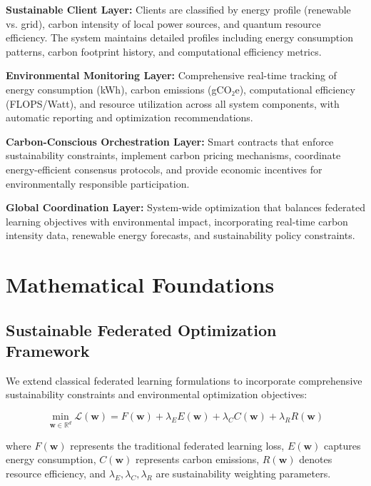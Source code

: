 \documentclass[10pt,journal,compsoc]{IEEEtran}
\newcommand{\vect}[1]{\mathbf{#1}}
\newcommand{\field}[1]{\mathbb{#1}}
\begin{document}
\textbf{Sustainable Client Layer:} Clients are classified by energy profile (renewable vs. grid), carbon intensity of local power sources, and quantum resource efficiency. The system maintains detailed profiles including energy consumption patterns, carbon footprint history, and computational efficiency metrics.

\textbf{Environmental Monitoring Layer:} Comprehensive real-time tracking of energy consumption (kWh), carbon emissions (gCO₂e), computational efficiency (FLOPS/Watt), and resource utilization across all system components, with automatic reporting and optimization recommendations.

\textbf{Carbon-Conscious Orchestration Layer:} Smart contracts that enforce sustainability constraints, implement carbon pricing mechanisms, coordinate energy-efficient consensus protocols, and provide economic incentives for environmentally responsible participation.

\textbf{Global Coordination Layer:} System-wide optimization that balances federated learning objectives with environmental impact, incorporating real-time carbon intensity data, renewable energy forecasts, and sustainability policy constraints.

\section{Mathematical Foundations}

\subsection{Sustainable Federated Optimization Framework}

We extend classical federated learning formulations to incorporate comprehensive sustainability constraints and environmental optimization objectives:

\begin{equation}
\min_{\vect{w} \in \field{R}^d} \mathcal{L}(\vect{w}) = F(\vect{w}) + \lambda_E E(\vect{w}) + \lambda_C C(\vect{w}) + \lambda_R R(\vect{w})
\label{eq:sustainable_objective}
\end{equation}

where $F(\vect{w})$ represents the traditional federated learning loss, $E(\vect{w})$ captures energy consumption, $C(\vect{w})$ represents carbon emissions, $R(\vect{w})$ denotes resource efficiency, and $\lambda_E, \lambda_C, \lambda_R$ are sustainability weighting parameters.
\end{document}
